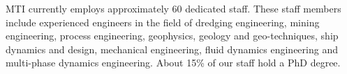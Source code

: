 \documentclass[a4paper,11pt]{../LatexDocStructures/MTItexMemo} %
\begin{document}
MTI currently employs approximately 60 dedicated staff. These staff members include experienced engineers in the field of dredging engineering, mining engineering, process engineering, geophysics, geology and geo-techniques, ship dynamics and design, mechanical engineering, fluid dynamics engineering and multi-phase dynamics engineering. About 15\% of our staff hold a PhD degree.

\end{document}
